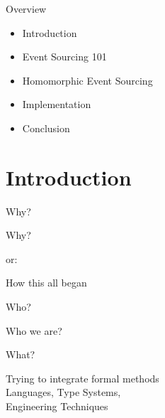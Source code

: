 \begin{frame}[fragile]{Overview}

\begin{itemize}
\item Introduction
\item Event Sourcing 101
\item Homomorphic Event Sourcing
\item Implementation
\item Conclusion
\end{itemize}

\end{frame}

\part{Introduction}

\begin{frame}[fragile]{Why?}

\begin{center}
{
\LARGE
Why?
}

\vspace{2em}

or:

\vspace{2em}

{
\Large
How this all began
}
\end{center}
\end{frame}


\begin{frame}[fragile]{Who?}

\begin{center}
{
\LARGE
Who we are?
}

\vspace{2em}
\end{center}
\end{frame}


\begin{frame}[fragile]{What?}

\begin{center}
{
\LARGE
Trying to integrate formal methods
\\[2em]
Languages, Type Systems, \\[.2em] Engineering Techniques
}

\vspace{2em}
\end{center}
\end{frame}

